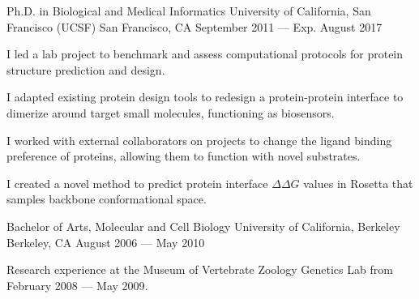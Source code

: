 

\begin{cventries}

  \cventry
  {Ph.D. in Biological and Medical Informatics} %
  {University of California, San Francisco (UCSF)} %
  {San Francisco, CA} %
  {September 2011 --- Exp. August 2017} %
  {
    \begin{cvitems} %
    \item I led a lab project to benchmark and assess computational protocols for protein structure prediction and design.
    \item I adapted existing protein design tools to redesign a
      protein-protein interface to dimerize around target small molecules, functioning
      as biosensors.
    \item I worked with external collaborators on projects to change the ligand binding preference of proteins, allowing them to function with novel substrates.
    \item I created a novel method to predict protein interface $\Delta\Delta G$ values in Rosetta that samples backbone conformational space.
    \end{cvitems}
  }

  \cventry
  {Bachelor of Arts, Molecular and Cell Biology} %
  {University of California, Berkeley} %
  {Berkeley, CA} %
  {August 2006 --- May 2010} %
  {
    \begin{cvitems} %
    \item Research experience at the Museum of Vertebrate Zoology Genetics Lab from February 2008 --- May 2009.
    \end{cvitems}
  }

\end{cventries}
